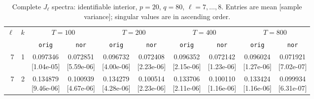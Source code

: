 \documentclass[12pt,letterpaper]{article}
\def\spacingset#1{\renewcommand{\baselinestretch}{#1}\small\normalsize}
\theoremstyle{plain}
\theoremstyle{definition}
\begin{document}
\clearpage
\begin{table}[p]
\begingroup
\spacingset{1.0}
\small\centering
\caption{Complete $J_\ell$ spectra: identifiable interior, $p=20$, $q=80$, $\ell=7,\ldots,8$. Entries are mean [sample variance]; singular values are in ascending order.}
\label{s23:lambda:alltab:spectra:p20q80interior:7-8}
\footnotesize
\setlength{\tabcolsep}{2.2pt}
\renewcommand{\arraystretch}{1.03}
\begin{adjustbox}{max width=\linewidth}
\begin{tabular}{@{}rr*{8}{c}@{}}
\toprule
$\ell$ & $k$ & \multicolumn{2}{c}{$T=100$} & \multicolumn{2}{c}{$T=200$} & \multicolumn{2}{c}{$T=400$} & \multicolumn{2}{c}{$T=800$}\\
\cmidrule(lr){3-4}\cmidrule(lr){5-6}\cmidrule(lr){7-8}\cmidrule(lr){9-10}
 &  & \texttt{orig} & \texttt{nor} & \texttt{orig} & \texttt{nor} & \texttt{orig} & \texttt{nor} & \texttt{orig} & \texttt{nor}\\
\midrule
7 & 1 & \shortstack{0.097346\\[-1pt]{\scriptsize[1.04e-05]}} & \shortstack{0.072851\\[-1pt]{\scriptsize[5.59e-06]}} & \shortstack{0.096732\\[-1pt]{\scriptsize[4.00e-06]}} & \shortstack{0.072408\\[-1pt]{\scriptsize[2.23e-06]}} & \shortstack{0.096352\\[-1pt]{\scriptsize[2.15e-06]}} & \shortstack{0.072142\\[-1pt]{\scriptsize[1.23e-06]}} & \shortstack{0.096024\\[-1pt]{\scriptsize[1.27e-06]}} & \shortstack{0.071921\\[-1pt]{\scriptsize[7.02e-07]}}\\
7 & 2 & \shortstack{0.134879\\[-1pt]{\scriptsize[9.46e-06]}} & \shortstack{0.100939\\[-1pt]{\scriptsize[4.67e-06]}} & \shortstack{0.134279\\[-1pt]{\scriptsize[4.28e-06]}} & \shortstack{0.100514\\[-1pt]{\scriptsize[2.23e-06]}} & \shortstack{0.133706\\[-1pt]{\scriptsize[2.11e-06]}} & \shortstack{0.100110\\[-1pt]{\scriptsize[1.16e-06]}} & \shortstack{0.133424\\[-1pt]{\scriptsize[1.16e-06]}} & \shortstack{0.099934\\[-1pt]{\scriptsize[6.31e-07]}}\\

\end{tabular}
\end{adjustbox}
\end{table}
\end{document}
